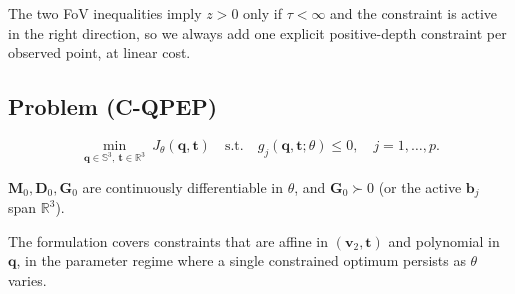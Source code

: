 The two FoV inequalities imply $z>0$ only if $\tau<\infty$ and the constraint is active in the right direction, so we always add one explicit positive-depth constraint per observed point, at linear cost.

\subsection{Problem (C-QPEP)}\label{sec:cqpep}
\begin{equation}
\min_{\mathbf q\in\mathbb{S}^3,\ \mathbf t\in\mathbb{R}^3}\ J_\theta(\mathbf q,\mathbf t)\quad\text{s.t.}\quad g_j(\mathbf q,\mathbf t;\theta)\le0,\quad j=1,\dots,p. \tag{C-QPEP}
\end{equation}
\begin{assumption}\label{asm:main}
$\mathbf M_0,\mathbf D_0,\mathbf G_0$ are continuously differentiable in $\theta$, and $\mathbf G_0\succ0$ (or the active $\mathbf b_j$ span $\mathbb{R}^3$).
\end{assumption}
The formulation covers constraints that are affine in $(\mathbf v_2,\mathbf t)$ and polynomial in $\mathbf q$, in the parameter regime where a single constrained optimum persists as $\theta$ varies.
